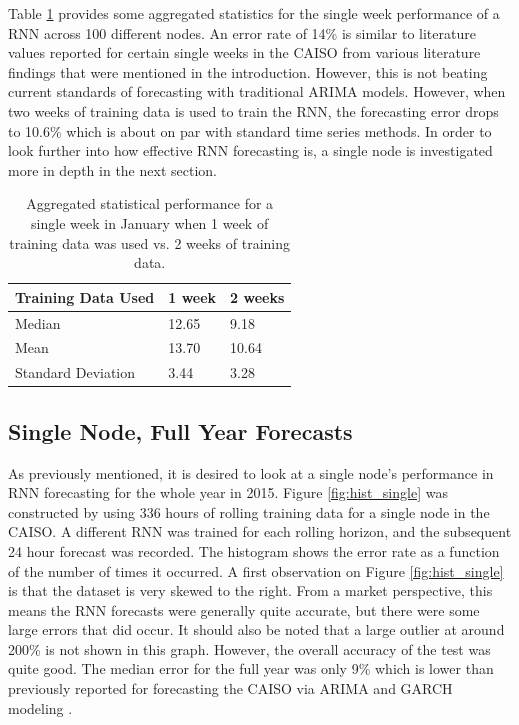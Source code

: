 \documentclass[sigconf]{acmart}
\begin{document}
Table \ref{tab:all_nodes} provides some aggregated statistics for the single week performance of a RNN across 100 different nodes. An error rate of 14\% is similar to literature values reported for certain single weeks in the CAISO from various literature findings that were mentioned in the introduction. However, this is not beating current standards of forecasting with traditional ARIMA models. However, when two weeks of training data is used to train the RNN, the forecasting error drops to 10.6\% which is about on par with standard time series methods. In order to look further into how effective RNN forecasting is, a single node is investigated more in depth in the next section.

\begin{table}[h]
\begin{tabular}{lll}
\hline
\hline
Training Data Used & 1 week & 2 weeks \\
\hline
Median             & 12.65  & 9.18     \\
Mean               &  13.70 & 10.64     \\
Standard Deviation & 3.44   & 3.28    \\
\hline
\hline
\end{tabular}
\caption{Aggregated statistical performance for a single week in January when 1 week of training data was used vs. 2 weeks of training data.}
\label{tab:all_nodes}
\end{table}

\subsection{Single Node, Full Year Forecasts}

As previously mentioned, it is desired to look at a single node's performance in RNN forecasting for the whole year in 2015. Figure \ref{fig:hist_single} was constructed by using 336 hours of rolling training data for a single node in the CAISO. A different RNN was trained for each rolling horizon, and the subsequent 24 hour forecast was recorded. The histogram shows the error rate as a function of the number of times it occurred. A first observation on Figure \ref{fig:hist_single} is that the dataset is very skewed to the right. From a market perspective, this means the RNN forecasts were generally quite accurate, but there were some large errors that did occur. It should also be noted that a large outlier at around 200\% is not shown in this graph. However, the overall accuracy of the test was quite good. The median error for the full year was only 9\% which is lower than previously reported for forecasting the CAISO via ARIMA and GARCH modeling \cite{Conejo2005a,Garcia2005}. 
\end{document}
